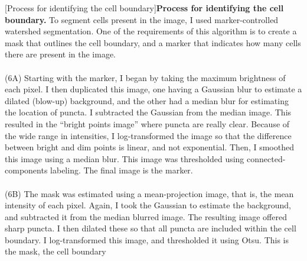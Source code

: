 \begin{centering}
[Process for identifying the cell boundary]{\textbf{Process for identifying the cell boundary.} To segment cells present in the image, I used marker-controlled watershed segmentation. One of the requirements of this algorithm is to create a mask that outlines the cell boundary, and a marker that indicates how many cells there are present in the image.
\\
\\
(6A) Starting with the marker, I began by taking the maximum brightness of each pixel. I then duplicated this image, one having a Gaussian blur to estimate a dilated (blow-up) background, and the other had a median blur for estimating the location of puncta. I subtracted the Gaussian from the median image. This resulted in the “bright points image” where puncta are really clear. Because of the wide range in intensities, I log-transformed the image so that the difference between bright and dim points is linear, and not exponential. Then, I smoothed this image using a median blur. This image was thresholded using connected-components labeling. The final image is the marker.
\\
\\
(6B) The mask was estimated using a mean-projection image, that is, the mean intensity of each pixel. Again, I took the Gaussian to estimate the background, and subtracted it from the median blurred image. The resulting image offered sharp puncta. I then dilated these so that all puncta are included within the cell boundary. I log-transformed this image, and thresholded it using Otsu. This is the mask, the cell boundary}
\label{m:S4}
\end{centering}

